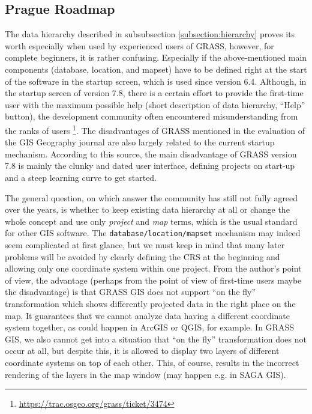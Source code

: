 \documentclass[a4paper,10pt,twoside]{article}
\begin{document}
\subsection{Prague Roadmap}
\label{section:Prague Roadmap}
\noindent
\large The data hierarchy described in subsubsection
\ref{subsection:hierarchy} proves its worth especially when used by
experienced users of GRASS, however, for complete beginners, it is
rather confusing. Especially if the above-mentioned main components
(database, location, and mapset) have to be defined right at the start
of the software in the startup screen, which is used since
version 6.4.  Although, in the startup screen of version 7.8, there is
a certain effort to provide the first-time user with the maximum
possible help (short description of data hierarchy, ``Help'' button), the
development community often encountered misunderstanding from the
ranks of users
\footnote{\url{https://trac.osgeo.org/grass/ticket/3474}}. The
disadvantages of GRASS mentioned in the evaluation of the GIS Geography
journal \cite{gisgeography} are also largely related to the current
startup mechanism. According to this source, the main disadvantage of
GRASS version 7.8 is mainly the clunky and dated user interface,
defining projects on start-up and a steep learning curve to get started.

The general question, on which answer the community has still not
fully agreed over the years, is whether to keep existing data
hierarchy at all or change the whole concept and use only
\textit{project} and \textit{map} terms, which is the usual standard
for other GIS software. The \texttt {database/location/mapset}
mechanism may indeed seem complicated at first glance, but we must
keep in mind that many later problems will be avoided by clearly
defining the CRS at the beginning and allowing only one coordinate
system within one project. From the author’s point of view, the
advantage (perhaps from the point of view of first-time users maybe
the disadvantage) is that GRASS GIS does not support ``on the fly''
transformation which shows differently projected data in the right
place on the map. It guarantees that we cannot analyze data having a
different coordinate system together, as could happen in ArcGIS or
QGIS, for example. In GRASS GIS, we also cannot get into a situation
that ``on the fly'' transformation does not occur at all, but despite
this, it is allowed to display two layers of different coordinate
systems on top of each other. This, of course, results in the
incorrect rendering of the layers in the map window (may happen
e.g. in SAGA GIS).
\end{document}
